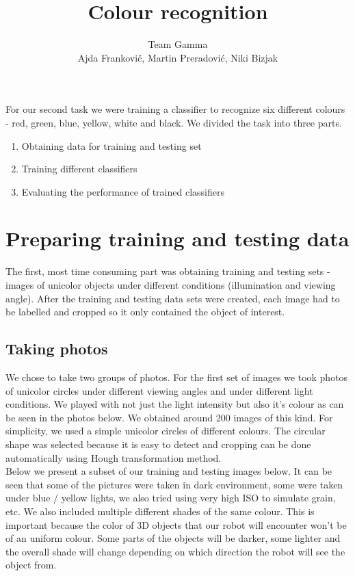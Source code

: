 \documentclass[12pt,a4paper]{article}
\author{Team Gamma \\ {\small Ajda Frankovič, Martin Preradović, Niki Bizjak}}
\title{Colour recognition}
\date{}
\begin{document}
	
	\maketitle
	
	For our second task we were training a classifier to recognize six different colours - red, green, blue, yellow, white and black. We divided the task into three parts. 

	\begin{enumerate}
		\item Obtaining data for training and testing set
		\item Training different classifiers
		\item Evaluating the performance of trained classifiers
	\end{enumerate}
		
	\section{Preparing training and testing data}

	The first, most time consuming part was obtaining training and testing sets - images of unicolor objects under different conditions (illumination and viewing angle). After the training and testing data sets were created, each image had to be labelled and cropped so it only contained the object of interest. \\

	\subsection{Taking photos}
	
	We chose to take two groups of photos. For the first set of images we took photos of unicolor circles under different viewing angles and under different light conditions. We played with not just the light intensity but also it's colour as can be seen in the photos below. We obtained around 200 images of this kind. For simplicity, we used a simple unicolor circles of different colours. The circular shape was selected because it is easy to detect and cropping can be done automatically using Hough transformation method. \\
	
	Below we present a subset of our training and testing images below. It can be seen that some of the pictures were taken in dark environment, some were taken under blue / yellow lights, we also tried using very high ISO to simulate grain, etc. We also included multiple different shades of the same colour. This is important because the color of 3D objects that our robot will encounter won't be of an uniform colour. Some parts of the objects will be darker, some lighter and the overall shade will change depending on which direction the robot will see the object from.
\end{document}
